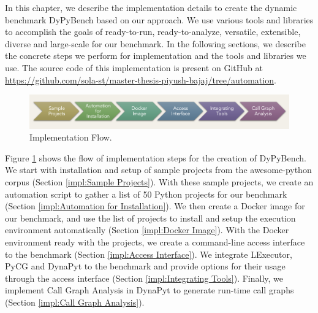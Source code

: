 In this chapter, we describe the implementation details to create the dynamic benchmark DyPyBench based on our approach.
We use various tools and libraries to accomplish the goals of ready-to-run, ready-to-analyze, versatile, extensible, diverse and large-scale for our benchmark.
In the following sections, we describe the concrete steps we perform for implementation and the tools and libraries we use.
The source code of this implementation is present on GitHub at \url{https://github.com/sola-st/master-thesis-piyush-bajaj/tree/automation}.

\begin{figure}[ht]
    \centering
    \includegraphics[width=1\linewidth]{figures/implementation/implementaion_flow.png}
    \caption{Implementation Flow.}
    \label{fig:implementation_flow}
\end{figure}

Figure \ref{fig:implementation_flow} shows the flow of implementation steps for the creation of DyPyBench. 
We start with installation and setup of sample projects from the awesome-python corpus (Section \ref{impl:Sample Projects}).
With these sample projects, we create an automation script to gather a list of 50 Python projects for our benchmark (Section \ref{impl:Automation for Installation}).
We then create a Docker image for our benchmark, and use the list of projects to install and setup the execution environment automatically (Section \ref{impl:Docker Image}).
With the Docker environment ready with the projects, we create a command-line access interface to the benchmark (Section \ref{impl:Access Interface}).   
We integrate LExecutor, PyCG and DynaPyt to the benchmark and provide options for their usage through the access interface (Section \ref{impl:Integrating Tools}).
Finally, we implement Call Graph Analysis in DynaPyt to generate run-time call graphs (Section \ref{impl:Call Graph Analysis}).

